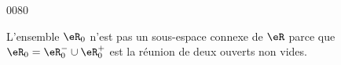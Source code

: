 
\begin{corrige}{0080}

L'ensemble $\eR_0$ n'est pas un sous-espace connexe de $\eR$ parce que  $\eR_0 = \eR_0^- \cup \eR_0^+$ est la réunion de deux ouverts non vides.

\end{corrige}
